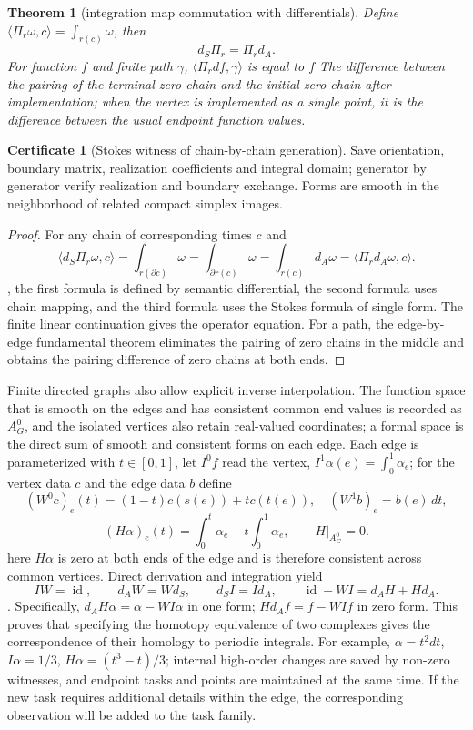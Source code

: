 \documentclass[11pt,a4paper]{article}
\theoremstyle{plain}
\newtheorem{theorem}{Theorem}[section]
\theoremstyle{definition}
\newtheorem*{certificate}{Certificate}
\theoremstyle{remark}
\begin{document}
\begin{CJK*}
\begin{theorem}
[integration map commutation with differentials]\label{pc:integration}
Define $\langle\Pi_r\omega,c\rangle=\int_{r(c)}\omega$, then \[
 d_S\Pi_r=\Pi_r d_A.
\] For function $f$ and finite path $\gamma$, $\langle\Pi_rdf,\gamma\rangle$ is equal to $f$ The difference between the pairing of the terminal zero chain and the initial zero chain after implementation; when the vertex is implemented as a single point, it is the difference between the usual endpoint function values.\end{theorem}
\begin{certificate}
[Stokes witness of chain-by-chain generation]Save orientation, boundary matrix, realization coefficients and integral domain; generator by generator verify realization and boundary exchange. Forms are smooth in the neighborhood of related compact simplex images.\end{certificate}
\begin{proof}
For any chain of corresponding times $c$ and \[
 \langle d_S\Pi_r\omega,c\rangle
 =\int_{r(\partial c)}\omega
 =\int_{\partial r(c)}\omega
 =\int_{r(c)}d_A\omega
 =\langle\Pi_rd_A\omega,c\rangle.
\], the first formula is defined by semantic differential, the second formula uses chain mapping, and the third formula uses the Stokes formula of single form. The finite linear continuation gives the operator equation. For a path, the edge-by-edge fundamental theorem eliminates the pairing of zero chains in the middle and obtains the pairing difference of zero chains at both ends.\end{proof}


Finite directed graphs also allow explicit inverse interpolation. The function space that is smooth on the edges and has consistent common end values is recorded as $A_G^0$, and the isolated vertices also retain real-valued coordinates; a formal space is the direct sum of smooth and consistent forms on each edge. Each edge is parameterized with $t\in[0,1]$, let $I^0f$ read the vertex, $I^1\alpha(e)=\int_0^1\alpha_e$; for the vertex data $c$ and the edge data $b$ define \[
 (W^0c)_e(t)=(1-t)c(s(e))+tc(t(e)),\quad
 (W^1b)_e=b(e)\,dt,
\] \[
 (H\alpha)_e(t)=\int_0^t\alpha_e-t\int_0^1\alpha_e,
 \qquad H|_{A_G^0}=0.
\] here $H\alpha$ is zero at both ends of the edge and is therefore consistent across common vertices. Direct derivation and integration yield \begin{equation}
\label{pc:eq-retraction}
 IW=\operatorname{id},\qquad d_AW=Wd_S,\qquad d_SI=Id_A,
 \qquad \operatorname{id}-WI=d_AH+Hd_A.
\end{equation}. Specifically, $d_AH\alpha=\alpha-WI\alpha$ in one form; $Hd_Af=f-WIf$ in zero form. This proves that specifying the homotopy equivalence of two complexes gives the correspondence of their homology to periodic integrals. For example, $\alpha=t^2dt$, $I\alpha=1/3$, $H\alpha=(t^3-t)/3$; internal high-order changes are saved by non-zero witnesses, and endpoint tasks and points are maintained at the same time. If the new task requires additional details within the edge, the corresponding observation will be added to the task family.


\end{CJK*}
\end{document}
